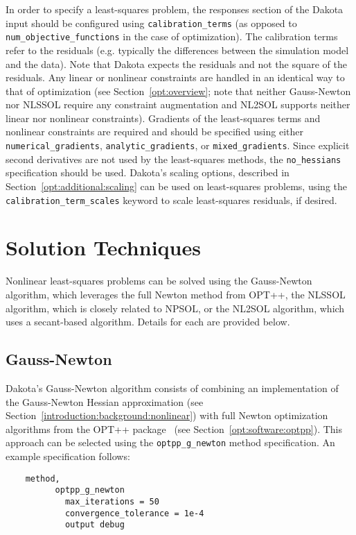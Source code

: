 In order to specify a least-squares problem, the responses section of
the Dakota input should be configured using
\texttt{calibration\_terms} (as opposed to
\texttt{num\_objective\_functions} in the case of optimization). 
The calibration terms refer to the residuals (e.g. typically the differences between 
the simulation model and the data).  Note that Dakota expects the residuals and 
not the square of the residuals.  Any
linear or nonlinear constraints are handled in an identical way to
that of optimization (see Section~\ref{opt:overview}; note that
neither Gauss-Newton nor NLSSOL require any constraint augmentation
and NL2SOL supports neither linear nor nonlinear constraints).
Gradients of the least-squares terms and nonlinear constraints are
required and should be specified using either
\texttt{numerical\_gradients}, \texttt{analytic\_gradients}, or
\texttt{mixed\_gradients}. Since explicit second derivatives
are not used by the least-squares methods,
the \texttt{no\_hessians} specification should be used.  Dakota's
scaling options, described in Section~\ref{opt:additional:scaling} can
be used on least-squares problems, using the
\texttt{calibration\_term\_scales} keyword to scale least-squares
residuals, if desired.

\section{Solution Techniques}\label{nls:solution}

Nonlinear least-squares problems can be solved using the Gauss-Newton
algorithm, which leverages the full Newton method from OPT++, the
NLSSOL algorithm, which is closely related to NPSOL, or the NL2SOL
algorithm, which uses a secant-based algorithm. Details for each are
provided below.

\subsection{Gauss-Newton}\label{nls:solution:gauss}

Dakota's Gauss-Newton algorithm consists of combining an
implementation of the Gauss-Newton Hessian approximation (see
Section~\ref{introduction:background:nonlinear}) with full Newton
optimization algorithms from the OPT++ package~\cite{MeOlHoWi07} (see
Section~\ref{opt:software:optpp}). This approach can be selected using
the \texttt{optpp\_g\_newton} method specification. An example
specification follows:
\begin{small}
\begin{verbatim}
    method,
          optpp_g_newton
            max_iterations = 50
            convergence_tolerance = 1e-4
            output debug
\end{verbatim}
\end{small}

